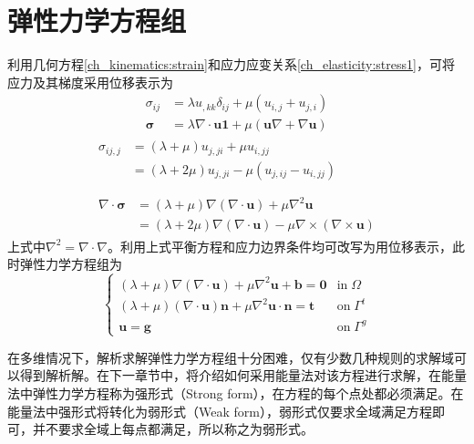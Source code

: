 \section{弹性力学方程组}
利用几何方程\eqref{ch_kinematics:strain}和应力应变关系\eqref{ch_elasticity:stress1}，可将应力及其梯度采用位移表示为
\begin{subequations}\label{ch_elasticity:stress2}
\begin{align}
    \sigma_{ij} &= \lambda u_{,kk} \delta_{ij} + \mu (u_{i,j} + u_{j,i}) \\
    \boldsymbol \sigma &= \lambda \nabla \cdot \boldsymbol u \boldsymbol 1 + \mu (\boldsymbol u \nabla + \nabla \boldsymbol u)
\end{align}
\end{subequations}
\begin{subequations}\label{ch_elasticity:stress3}
\begin{align}
    \begin{split}
        \sigma_{ij,j} &= (\lambda+\mu) u_{j,ji} + \mu u_{i,jj} \\
                      &= (\lambda+2\mu) u_{j,ji} - \mu (u_{j,ij} - u_{i,jj}) \\
    \end{split} \\
    \begin{split}
    \nabla \cdot \boldsymbol \sigma &= (\lambda+\mu) \nabla(\nabla \cdot \boldsymbol u) + \mu \nabla^2 \boldsymbol u \\
                                    &= (\lambda+2\mu) \nabla(\nabla \cdot \boldsymbol u) - \mu \nabla \times (\nabla \times \boldsymbol u)
    \end{split}
\end{align}
\end{subequations}
上式中$\nabla^2 = \nabla \cdot \nabla$。利用上式平衡方程和应力边界条件均可改写为用位移表示，此时弹性力学方程组为
\begin{equation}\label{ch_elasticity:strong}
\left \{
\begin{array}{ll}
    (\lambda+\mu) \nabla(\nabla \cdot \boldsymbol u) + \mu \nabla^2\boldsymbol u + \boldsymbol b = \boldsymbol 0 & \mathrm{in} \; \Omega \\
    (\lambda+\mu) (\nabla \cdot \boldsymbol u)\boldsymbol n + \mu \nabla^2\boldsymbol u \cdot \boldsymbol n = \boldsymbol t & \mathrm{on}\; \Gamma^t \\
    \boldsymbol u = \boldsymbol g & \mathrm{on}\; \Gamma^g
\end{array}
\right .
\end{equation}\par
在多维情况下，解析求解弹性力学方程组十分困难，仅有少数几种规则的求解域可以得到解析解。在下一章节中，将介绍如何采用能量法对该方程进行求解，在能量法中弹性力学方程称为强形式（Strong form），在方程的每个点处都必须满足。在能量法中强形式将转化为弱形式（Weak form），弱形式仅要求全域满足方程即可，并不要求全域上每点都满足，所以称之为弱形式。
